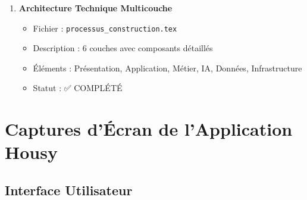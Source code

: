 \begin{enumerate}
    \item \textbf{Architecture Technique Multicouche}
    \begin{itemize}
        \item Fichier : \texttt{processus\_construction.tex}
        \item Description : 6 couches avec composants détaillés
        \item Éléments : Présentation, Application, Métier, IA, Données, Infrastructure
        \item Statut : ✅ COMPLÉTÉ
    \end{itemize}
\end{enumerate}

\section{Captures d'Écran de l'Application Housy}

\subsection{Interface Utilisateur}

